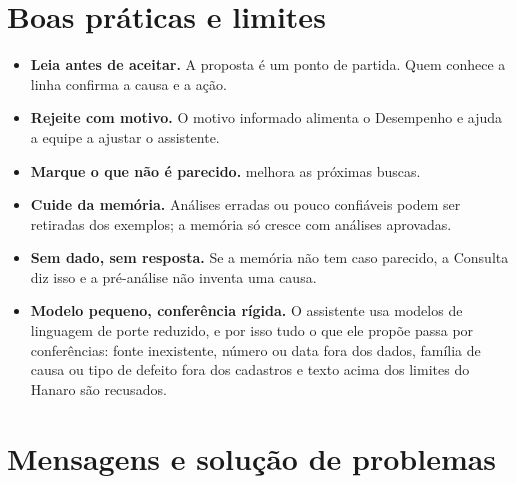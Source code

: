 \section{Boas práticas e limites}

\begin{itemize}
    \item \textbf{Leia antes de aceitar.} A proposta é um ponto de partida. Quem conhece
          a linha confirma a causa e a ação.
    \item \textbf{Rejeite com motivo.} O motivo informado alimenta o Desempenho e ajuda
          a equipe a ajustar o assistente.
    \item \textbf{Marque o que não é parecido.}  melhora as
          próximas buscas.
    \item \textbf{Cuide da memória.} Análises erradas ou pouco confiáveis podem ser
          retiradas dos exemplos; a memória só cresce com análises aprovadas.
    \item \textbf{Sem dado, sem resposta.} Se a memória não tem caso parecido, a
          Consulta diz isso e a pré-análise não inventa uma causa.
    \item \textbf{Modelo pequeno, conferência rígida.} O assistente usa modelos de
          linguagem de porte reduzido, e por isso tudo o que ele propõe passa por
          conferências: fonte inexistente, número ou data fora dos dados, família de
          causa ou tipo de defeito fora dos cadastros e texto acima dos limites do
          Hanaro são recusados.
\end{itemize}

\section{Mensagens e solução de problemas}

